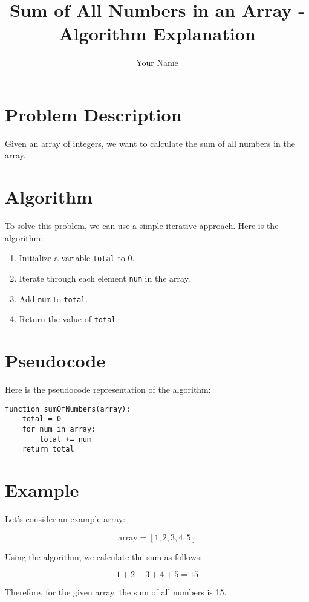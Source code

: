 \documentclass{article}
\title{Sum of All Numbers in an Array - Algorithm Explanation}
\author{Your Name}
\date{}
\begin{document}
\maketitle

\section*{Problem Description}

Given an array of integers, we want to calculate the sum of all numbers in the array.

\section*{Algorithm}

To solve this problem, we can use a simple iterative approach. Here is the algorithm:

\begin{enumerate}
  \item Initialize a variable \texttt{total} to 0.
  \item Iterate through each element \texttt{num} in the array.
  \item Add \texttt{num} to \texttt{total}.
  \item Return the value of \texttt{total}.
\end{enumerate}

\section*{Pseudocode}

Here is the pseudocode representation of the algorithm:

\begin{verbatim}
function sumOfNumbers(array):
    total = 0
    for num in array:
        total += num
    return total
\end{verbatim}

\section*{Example}

Let's consider an example array:

\[
\text{{array}} = [1, 2, 3, 4, 5]
\]

Using the algorithm, we calculate the sum as follows:

\[
1 + 2 + 3 + 4 + 5 = 15
\]

Therefore, for the given array, the sum of all numbers is 15.
\end{document}
